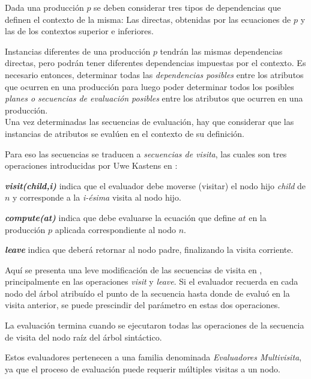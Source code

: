 \documentclass[a4paper]{article}
\begin{document}
Dada una producción $p$ se deben considerar tres tipos de dependencias que definen el contexto de la misma: Las directas, obtenidas por las ecuaciones de $p$ y las de los contextos superior e inferiores.

Instancias diferentes de una producción $p$ tendrán las mismas dependencias directas, pero podrán tener diferentes dependencias impuestas por el contexto. Es necesario entonces, determinar todas las \emph{dependencias posibles} entre los atributos que ocurren en una producción para luego poder determinar todos los posibles \emph{planes o secuencias de evaluación posibles} entre los atributos que ocurren en una producción. \\

Una vez determinadas las secuencias de evaluación, hay que considerar que las instancias
de atributos se evalúen en el contexto de su definición.

Para eso las secuencias se traducen a \emph{secuencias de visita}, las cuales son tres
operaciones introducidas por Uwe Kastens en \cite{kastens}:

\begin{description}
\item \emph{\textbf{visit(child,i)}} indica que el evaluador debe moverse (visitar) el nodo hijo \emph{child} de $n$ y corresponde a la \emph{i-ésima} visita al nodo hijo.

\item \emph{\textbf{compute(at)}} indica que debe evaluarse la ecuación que define $at$ en la producción $p$ aplicada correspondiente al nodo $n$.

\item \emph{\textbf{leave}} indica que deberá retornar al nodo padre, finalizando la visita corriente.
\end{description}

Aquí se presenta una leve modificación de las secuencias de visita en \cite{kastens}, principalmente en las operaciones \emph{visit} y \emph{leave}. Si el evaluador recuerda en cada
nodo del árbol atribuído el punto de la secuencia hasta donde de evaluó en la visita anterior,
se puede prescindir del parámetro en estas dos operaciones.

La evaluación termina cuando se ejecutaron todas las operaciones de la secuencia de visita del nodo raíz del árbol sintáctico.

Estos evaluadores pertenecen a una familia denominada \emph{Evaluadores Multivisita}, ya que el proceso de evaluación puede requerir múltiples visitas a un nodo.
\end{document}
